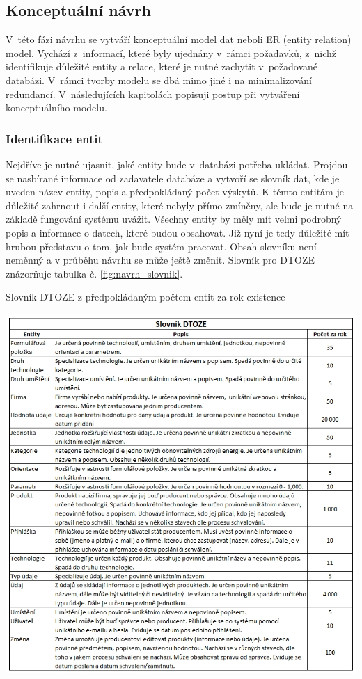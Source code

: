 \documentclass[11pt,a4paper]{article}
\begin{document}
\subsection{Konceptuální návrh}
V~této fázi návrhu se vytváří konceptuální model dat neboli ER (entity relation) model. Vychází z~informací, které byly ujednány v~rámci požadavků, z~nichž identifikuje důležité entity a relace, které je nutné zachytit v~požadované databázi. V~rámci tvorby modelu se dbá mimo jiné i na minimalizování redundancí. V~následujících kapitolách popisuji postup při vytváření konceptuálního modelu. 

\subsubsection{Identifikace entit}
Nejdříve je nutné ujasnit, jaké entity bude v~databázi potřeba ukládat. Projdou se nasbírané informace od zadavatele databáze a vytvoří se slovník dat, kde je uveden název entity, popis a předpokládaný počet výskytů. K těmto entitám je důležité zahrnout i další entity, které nebyly přímo zmíněny, ale bude je nutné na základě fungování systému uvážit. Všechny entity by měly mít velmi podrobný popis a informace o datech, které budou obsahovat. Již nyní je tedy důležité mít hrubou představu o tom, jak bude systém pracovat. Obsah slovníku není neměnný a v průběhu návrhu se může ještě změnit. Slovník pro DTOZE znázorňuje tabulka č. \ref{fig:navrh_slovnik}.

\begin{table}[H] 
\centering 
\caption{Slovník DTOZE z předpokládaným počtem entit za rok existence} 
\includegraphics[scale=0.57]{DTOZE_konc_slovnik} 
\label{fig:navrh_slovnik}
\end{table} 
\end{document}
